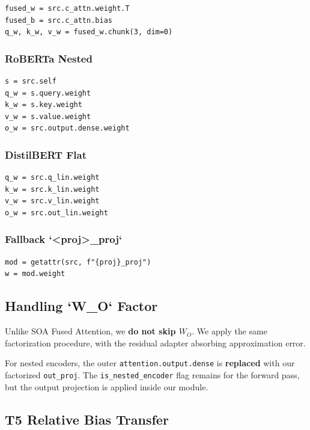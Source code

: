 \begin{lstlisting}
fused_w = src.c_attn.weight.T
fused_b = src.c_attn.bias
q_w, k_w, v_w = fused_w.chunk(3, dim=0)
\end{lstlisting}

\subsubsection{RoBERTa Nested}

\begin{lstlisting}
s = src.self
q_w = s.query.weight
k_w = s.key.weight
v_w = s.value.weight
o_w = src.output.dense.weight
\end{lstlisting}

\subsubsection{DistilBERT Flat}

\begin{lstlisting}
q_w = src.q_lin.weight
k_w = src.k_lin.weight
v_w = src.v_lin.weight
o_w = src.out_lin.weight
\end{lstlisting}

\subsubsection{Fallback `<proj>\_proj`}

\begin{lstlisting}
mod = getattr(src, f"{proj}_proj")
w = mod.weight
\end{lstlisting}

\subsection{Handling `W\_O` Factor}

Unlike SOA Fused Attention, we \textbf{do not skip $W_O$}. We apply the same 
factorization procedure, with the residual adapter absorbing approximation 
error.

For nested encoders, the outer \texttt{attention.output.dense} is \textbf{replaced} with 
our factorized \texttt{out\_proj}. The \texttt{is\_nested\_encoder} flag remains for the 
forward pass, but the output projection is applied inside our module.

\subsection{T5 Relative Bias Transfer}

